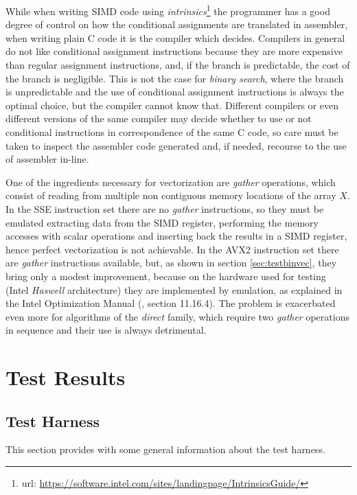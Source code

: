 \documentclass[preprint,1p,times]{elsarticle}
\begin{document}
While when writing SIMD code using \textit{intrinsics}\footnote{url: \url{https://software.intel.com/sites/landingpage/IntrinsicsGuide/}} the programmer has a good degree of control on how the conditional assignments are translated in assembler, when writing plain C code it is the compiler which decides. Compilers in general do not like conditional assignment instructions because they are more expensive than regular assignment instructions, and, if the branch is predictable, the cost of the branch is negligible. This is not the case for \textit{binary search}, where the branch is unpredictable and the use of conditional assignment instructions is always the optimal choice, but the compiler cannot know that. Different compilers or even different versions of the same compiler may decide whether to use or not conditional instructions in correspondence of the same C code, so care must be taken to inspect the assembler code generated and, if needed, recourse to the use of assembler in-line.

One of the ingredients necessary for vectorization are \textit{gather} operations, which consist of reading from multiple non contiguous memory locations of the array $X$.
In the SSE instruction set there are no \textit{gather} instructions, so they must be emulated extracting data from the SIMD register, performing the memory accesses with scalar operations and inserting back the results in a SIMD register, hence perfect vectorization is not achievable.
In the AVX2 instruction set there are \textit{gather} instructions available, but, as shown in section \ref{sec:testbinvec}, they bring only a modest improvement, because on the hardware used for testing (Intel \textit{Haswell} architecture) they are implemented by emulation, as explained in the Intel Optimization Manual (\cite{Intel2016}, section 11.16.4). The problem is exacerbated even more for algorithms of the \textit{direct} family, which require two \textit{gather} operations in sequence and their use is always detrimental.

\section{Test Results}
\label{sec:results}

\subsection{Test Harness}
This section provides with some general information about the test harness.
\end{document}
